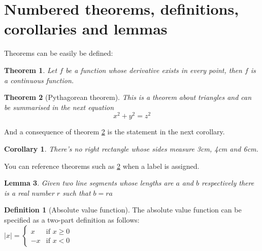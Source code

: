 \documentclass[10pt, a4paper]{article}
\newtheorem{theorem}{Theorem}[section]
\newtheorem{corollary}{Corollary}[theorem]
\newtheorem{lemma}[theorem]{Lemma}
\theoremstyle{definition}
\newtheorem{definition}{Definition}[section]
\begin{document}
\section{Numbered theorems, definitions, corollaries and lemmas}
Theorems can be easily be defined:
\begin{theorem}
Let \(f\) be a function whose derivative exists in every point, then \(f\) is a continuous function.
\end{theorem}

\begin{theorem}[Pythagorean theorem]
\label{Pythagorean}
This is a theorem about triangles and can be summarised in the next equation
\[x^2 + y^2 = z^2\]
\end{theorem}
And a consequence of theorem \ref{Pythagorean} is the statement in the next corollary.

\begin{corollary}
There's no right rectangle whose sides measure 3cm, 4cm and 6cm.
\end{corollary}
You can reference theorems such as \ref{Pythagorean} when a label is assigned.

\begin{lemma}
Given two line segments whose lengths are \(a\) and \(b\) respectively there is a real number \(r\) such that \(b=ra\)
\end{lemma}

\begin{definition}[Absolute value function]
The absolute value function can be specified as a two-part definition as follows:\\
$
|x| = 
	\left\{
		\begin{array}{ll}
			x & \mbox{if } x \geq 0 \\
			-x & \mbox{if } x < 0
		\end{array}	
	\right.		
$
\end{definition}
\end{document}

